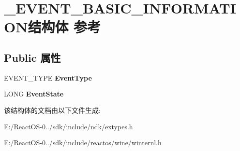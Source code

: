 \hypertarget{struct___e_v_e_n_t___b_a_s_i_c___i_n_f_o_r_m_a_t_i_o_n}{}\section{\+\_\+\+E\+V\+E\+N\+T\+\_\+\+B\+A\+S\+I\+C\+\_\+\+I\+N\+F\+O\+R\+M\+A\+T\+I\+O\+N结构体 参考}
\label{struct___e_v_e_n_t___b_a_s_i_c___i_n_f_o_r_m_a_t_i_o_n}
\subsection*{Public 属性}
\begin{DoxyCompactItemize}
\item 
\mbox{\label{struct___e_v_e_n_t___b_a_s_i_c___i_n_f_o_r_m_a_t_i_o_n_ace49b9bd46c6b3e355e98e0f9e8749e8}} 
E\+V\+E\+N\+T\+\_\+\+T\+Y\+PE {\bfseries Event\+Type}
\item 
\mbox{\label{struct___e_v_e_n_t___b_a_s_i_c___i_n_f_o_r_m_a_t_i_o_n_a9abc743617116c8e93062ccee900f407}} 
L\+O\+NG {\bfseries Event\+State}
\end{DoxyCompactItemize}


该结构体的文档由以下文件生成\+:\begin{DoxyCompactItemize}
\item 
E\+:/\+React\+O\+S-\/0../sdk/include/ndk/extypes.\+h\item 
E\+:/\+React\+O\+S-\/0../sdk/include/reactos/wine/winternl.\+h\end{DoxyCompactItemize}
